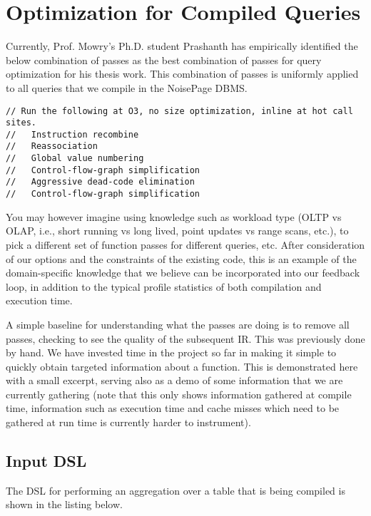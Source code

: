 \documentclass{vldb}
\begin{document}
\appendix
\section{Optimization for Compiled Queries}

Currently, Prof. Mowry's Ph.D. student Prashanth has empirically identified the below combination of passes as the best combination of passes for query optimization for his thesis work. This combination of passes is uniformly applied to all queries that we compile in the NoisePage DBMS.

\begin{lstlisting}
// Run the following at O3, no size optimization, inline at hot call sites.
//   Instruction recombine
//   Reassociation
//   Global value numbering
//   Control-flow-graph simplification
//   Aggressive dead-code elimination
//   Control-flow-graph simplification
\end{lstlisting}

You may however imagine using knowledge such as workload type (OLTP vs OLAP, i.e., short running vs long lived, point updates vs range scans, etc.), to pick a different set of function passes for different queries, etc. After consideration of our options and the constraints of the existing code, this is an example of the domain-specific knowledge that we believe can be incorporated into our feedback loop, in addition to the typical profile statistics of both compilation and execution time.

A simple baseline for understanding what the passes are doing is to remove all passes, checking to see the quality of the subsequent IR. This was previously done by hand. We have invested time in the project so far in making it simple to quickly obtain targeted information about a function. This is demonstrated here with a small excerpt, serving also as a demo of some information that we are currently gathering (note that this only shows information gathered at compile time, information such as execution time and cache misses which need to be gathered at run time is currently harder to instrument).

\subsection{Input DSL}

The DSL for performing an aggregation over a table that is being compiled is shown in the listing below.
\end{document}
